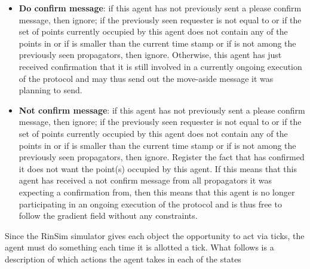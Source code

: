 \begin{itemize}
    \item \textbf{Do confirm message}: if this agent has not previously sent a please confirm message, then ignore; if the previously seen requester is not equal to  or if the set of points currently occupied by this agent does not contain any of the points in  or if  is smaller than the current time stamp or if  is not among the previously seen propagators, then ignore. Otherwise, this agent has just received confirmation that it is still involved in a currently ongoing execution of the protocol and may thus send out the move-aside message it was planning to send.
    \item \textbf{Not confirm message}: if this agent has not previously sent a please confirm message, then ignore; if the previously seen requester is not equal to  or if the set of points currently occupied by this agent does not contain any of the points in  or if  is smaller than the current time stamp or if  is not among the previously seen propagators, then ignore. Register the fact that  has confirmed it does not want the point(s) occupied by this agent. If this means that this agent has received a not confirm message from all propagators it was expecting a confirmation from, then this means that this agent is no longer participating in an ongoing execution of the protocol and is thus free to follow the gradient field without any constraints.
\end{itemize}

Since the RinSim simulator gives each object the opportunity to act via ticks, the agent must do something each time it is allotted a tick. What follows is a description of which actions the agent takes in each of the states

